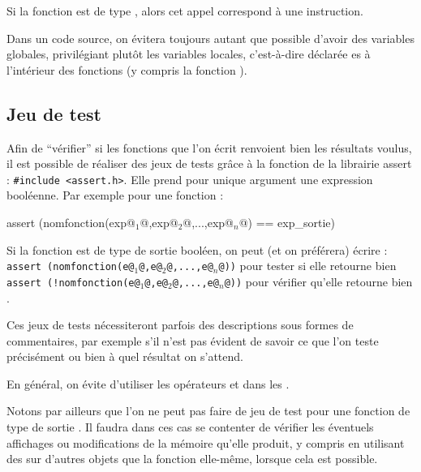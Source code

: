 		\begin{Remarque}
			Si la fonction est de type , alors cet appel correspond à une instruction.
		\end{Remarque}
		
		\vs{2}
		\begin{Remarque}
			Dans un code source, on évitera toujours autant que possible d'avoir des variables globales, privilégiant plutôt les variables locales, c'est-à-dire déclarée es à l'intérieur des fonctions (y compris la fonction \cc{main}).
		\end{Remarque}
	
	\subsection{Jeu de test}
	
		Afin de ``vérifier'' si les fonctions que l'on écrit renvoient bien les résultats voulus, il est possible de réaliser des jeux de tests grâce à la fonction  de la librairie assert : \texttt{#include <assert.h>}. \nll
		Elle prend pour unique argument une expression booléenne. Par exemple pour une fonction :
			\begin{C}
				assert (nomfonction(exp@$_1$@,exp@$_2$@,...,exp@$_n$@) == exp_sortie)	
			\end{C}
		Si la fonction est de type de sortie booléen, on peut (et on préférera) écrire : \\
			 \bdot \texttt{assert (nomfonction(e@$_1$@,e@$_2$@,...,e@$_n$@))} pour tester si elle retourne bien \cc{true} \\
			 \bdot \texttt{assert (!nomfonction(e@$_1$@,e@$_2$@,...,e@$_n$@))} pour vérifier qu'elle retourne bien \cc{false}.	
		
		\begin{Remarque}
			Ces jeux de tests nécessiteront parfois des descriptions sous formes de commentaires, par exemple s'il n'est pas évident de savoir ce que l'on teste précisément ou bien à quel résultat on s'attend.
		\end{Remarque}
		
		\begin{Remarque}
			En général, on évite d'utiliser les opérateurs \cc{&&} et \cc{||} dans les \cc{assert}.
		\end{Remarque}
	
		\begin{Remarque}
			Notons par ailleurs que l'on ne peut pas faire de jeu de test pour une fonction de type de sortie . Il faudra dans ces cas se contenter de vérifier les éventuels affichages ou modifications de la mémoire qu'elle produit, y compris en utilisant des  sur d'autres objets que la fonction elle-même, lorsque cela est possible.
		\end{Remarque}
